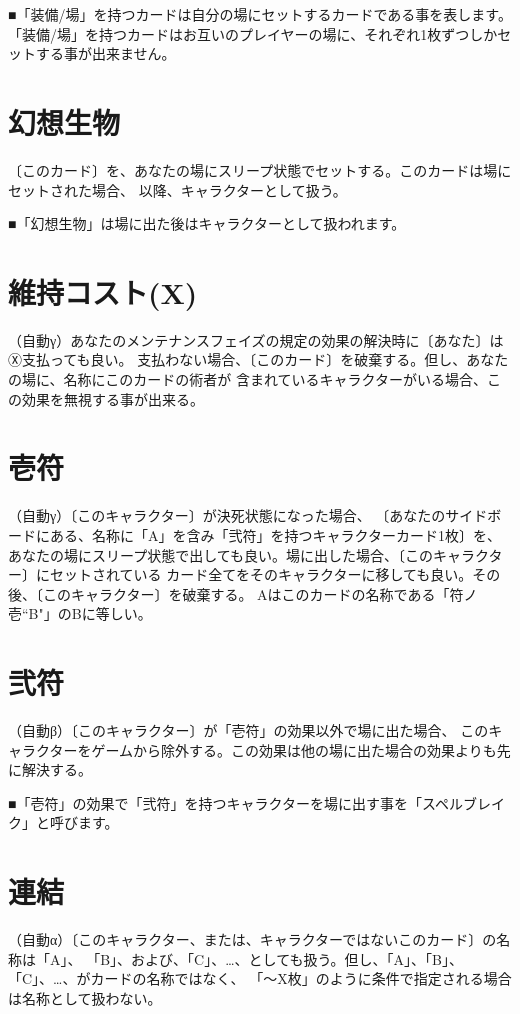 \documentclass[
	fontsize=9pt,
	twocolumn,
	hanging_punctuation,
	paper=a4paper,
	gutter=15mm,
	fore-edge=15mm,
	head_space=15mm,
	foot_space=15mm,
]{jlreq}
\newcommand{\↴}{{\jfontspec{nishiki-teki}↴}}
\begin{document}
■「装備/場」を持つカードは自分の場にセットするカードである事を表します。
「装備/場」を持つカードはお互いのプレイヤーの場に、それぞれ1枚ずつしかセットする事が出来ません。

\section*{幻想生物}
〔このカード〕を、あなたの場にスリープ状態でセットする。このカードは場にセットされた場合、
以降、キャラクターとして扱う。

■「幻想生物」は場に出た後はキャラクターとして扱われます。

\section*{維持コスト(X)}
（自動γ）あなたのメンテナンスフェイズの規定の効果の解決時に〔あなた〕はⓍ支払っても良い。
支払わない場合、〔このカード〕を破棄する。但し、あなたの場に、名称にこのカードの術者が
含まれているキャラクターがいる場合、この効果を無視する事が出来る。

\section*{壱符}
（自動γ）〔このキャラクター〕が決死状態になった場合、
〔あなたのサイドボードにある、名称に「A」を含み「弐符」を持つキャラクターカード1枚〕を、
あなたの場にスリープ状態で出しても良い。場に出した場合、〔このキャラクター〕にセットされている
カード全てをそのキャラクターに移しても良い。その後、〔このキャラクター〕を破棄する。
Aはこのカードの名称である「符ノ壱``B"」のBに等しい。

\section*{弐符}
（自動β）〔このキャラクター〕が「壱符」の効果以外で場に出た場合、
このキャラクターをゲームから除外する。この効果は他の場に出た場合の効果よりも先に解決する。

■「壱符」の効果で「弐符」を持つキャラクターを場に出す事を「スペルブレイク」と呼びます。

\pagebreak
\section*{連結}
（自動α）〔このキャラクター、または、キャラクターではないこのカード〕の名称は「A」、
「B」、および、「C」、…、としても扱う。但し、「A」、「B」、「C」、…、がカードの名称ではなく、
「～X枚」のように条件で指定される場合は名称として扱わない。
\end{document}
